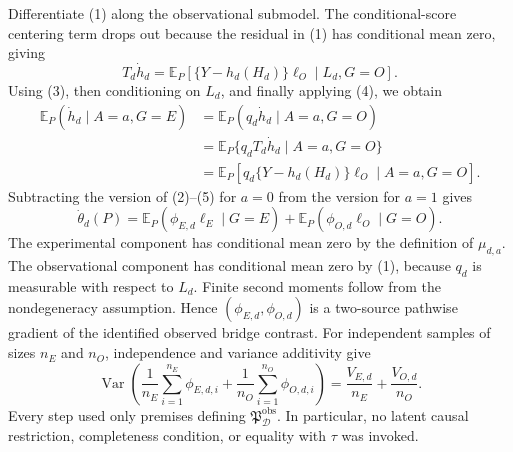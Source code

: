 Differentiate (1) along the observational submodel.  The conditional-score centering term drops out because the residual in (1) has conditional mean zero, giving
\[
 T_d\dot h_d
 =\mathbb E_P[\{Y-h_d(H_d)\}\ell_O\mid L_d,G=O].       \tag{4}
\]
Using (3), then conditioning on \(L_d\), and finally applying (4), we obtain
\[
\begin{aligned}
 \mathbb E_P(\dot h_d\mid A=a,G=E)
 &=\mathbb E_P(q_d\dot h_d\mid A=a,G=O)\\
 &=\mathbb E_P\{q_dT_d\dot h_d\mid A=a,G=O\}\\
 &=\mathbb E_P[q_d\{Y-h_d(H_d)\}\ell_O\mid A=a,G=O]. \tag{5}
\end{aligned}
\]
Subtracting the version of (2)--(5) for \(a=0\) from the version for \(a=1\) gives
\[
 \dot\theta_d(P)
 =\mathbb E_P(\phi_{E,d}\ell_E\mid G=E)
  +\mathbb E_P(\phi_{O,d}\ell_O\mid G=O).             \tag{6}
\]
The experimental component has conditional mean zero by the definition of \(\mu_{d,a}\).  The observational component has conditional mean zero by (1), because \(q_d\) is measurable with respect to \(L_d\).  Finite second moments follow from the nondegeneracy assumption.  Hence \((\phi_{E,d},\phi_{O,d})\) is a two-source pathwise gradient of the identified observed bridge contrast.  For independent samples of sizes \(n_E\) and \(n_O\), independence and variance additivity give
\[
 \operatorname{Var}\!\left(
 \frac1{n_E}\sum_{i=1}^{n_E}\phi_{E,d,i}
 +\frac1{n_O}\sum_{i=1}^{n_O}\phi_{O,d,i}
 \right)
 =\frac{V_{E,d}}{n_E}+\frac{V_{O,d}}{n_O}.
\]
Every step used only premises defining \(\mathfrak P_{\mathcal D}^{\mathrm{obs}}\).  In particular, no latent causal restriction, completeness condition, or equality with \(\tau\) was invoked.